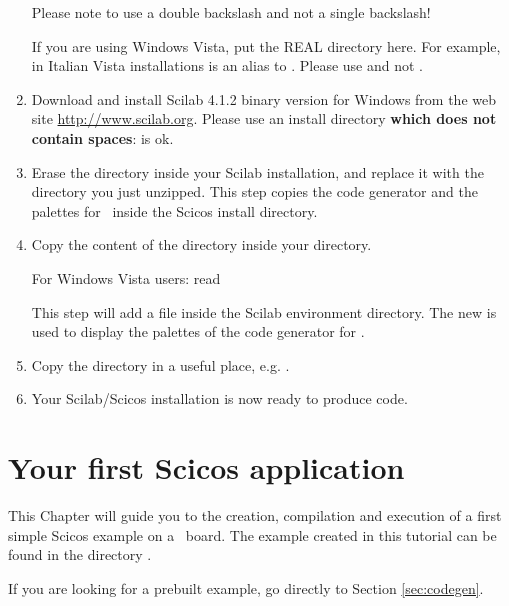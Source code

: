 \begin{enumerate}
  Please note to use a double backslash and not a
  single backslash!
\begin{warning}
If you are using Windows Vista, put the REAL directory here. For example, in Italian Vista installations  is an alias to . Please use  and not .
\end{warning}

\item Download and install Scilab 4.1.2 binary version for Windows from
  the web site \url{http://www.scilab.org}. Please use an install
  directory {\bf which does not contain spaces}:
   is ok.
\item Erase the  directory inside your Scilab
  installation, and replace it with the 
  directory you just unzipped. This step copies the code generator and
  the palettes for \flex\ inside the Scicos install directory.
\item Copy the content of the  directory inside your
   directory. 
  \begin{warning}
  For Windows Vista users: read 
  \end{warning}
  This step will
  add a  file inside the Scilab environment
  directory. The new  is used to display the palettes
  of the code generator for \flex.

\item Copy the  directory in a useful place,
  e.g. .
\item Your Scilab/Scicos installation is now ready to produce code.
\end{enumerate}

\chapter{Your first Scicos application}
\label{ch:firstexample}

This Chapter will guide you to the creation, compilation and execution
of a first simple Scicos example on a \flex\ board. The example
created in this tutorial can be found in the directory
.

If you are looking for a prebuilt example, go directly to Section
\ref{sec:codegen}.

